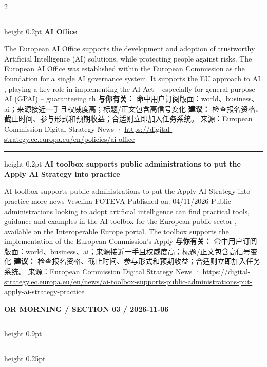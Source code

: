 \documentclass[10.5pt]{ctexart}
\begin{document}
\begin{multicols}{2}
\vspace{2mm}
\hrule height 0.2pt
\vspace{2mm}
{\large\bfseries AI Office}\par
The European AI Office supports the development and adoption of trustworthy Artificial Intelligence (AI) solutions, while protecting people against risks. The European AI Office was established within the European Commission as the foundation for a single AI governance system. It supports the EU approach to AI , playing a key role in implementing the AI Act – especially for general-purpose AI (GPAI) – guaranteeing th
\textbf{与你有关：} 命中用户订阅版面：world、business、ai；来源接近一手且权威度高；标题/正文包含高信号变化
\textbf{建议：} 检查报名资格、截止时间、参与形式和预期收益；合适则立即加入任务系统。
{\footnotesize\color{ormuted} 来源：European Commission Digital Strategy News · \url{https://digital-strategy.ec.europa.eu/en/policies/ai-office}}
\vspace{2mm}
\hrule height 0.2pt
\vspace{2mm}
{\large\bfseries AI toolbox supports public administrations to put the Apply AI Strategy into practice}\par
AI toolbox supports public administrations to put the Apply AI Strategy into practice more news Veselina FOTEVA Published on: 04/11/2026 Public administrations looking to adopt artificial intelligence can find practical tools, guidance and examples in the AI toolbox for the European public sector , available on the Interoperable Europe portal. The toolbox supports the implementation of the European Commission’s Apply
\textbf{与你有关：} 命中用户订阅版面：world、business、ai；来源接近一手且权威度高；标题/正文包含高信号变化
\textbf{建议：} 检查报名资格、截止时间、参与形式和预期收益；合适则立即加入任务系统。
{\footnotesize\color{ormuted} 来源：European Commission Digital Strategy News · \url{https://digital-strategy.ec.europa.eu/en/news/ai-toolbox-supports-public-administrations-put-apply-ai-strategy-practice}}
\end{multicols}
\newpage
{\small\bfseries OR MORNING / SECTION 03 / 2026-11-06}
\vspace{2mm}
\hrule height 0.9pt
\vspace{1.5mm}
\hrule height 0.25pt
\vspace{4mm}
\end{document}
